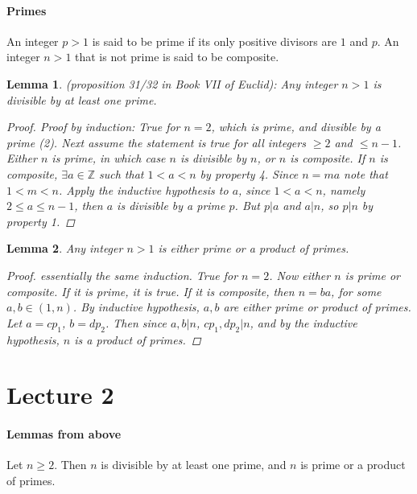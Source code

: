 \documentclass[10pt,letter]{article}
\theoremstyle{plain}
\newtheorem*{lemma*}{Lemma}
\theoremstyle{definition}
\begin{document}
\paragraph{Primes}
An integer $p>1$ is said to be prime if its only positive divisors are $1$ and $p$. An integer $n>1$ that is not prime is said to be composite. \\ 
\begin{lemma*}(proposition 31/32 in Book VII of Euclid): Any integer $n>1$ is divisible by at least one prime. 
\begin{proof}Proof by induction: True for $n=2$, which is prime, and divsible by a prime (2). Next assume the statement is true for all integers $\geq2$ and $\leq n-1$. Either $n$ is prime, in which case $n$ is divisible by $n$, or $n$ is composite. If $n$ is composite, $\exists a\in\mathbb{Z}$ such that $1<a<n$ by property 4. Since $n=ma$ note that $1<m<n$. Apply the inductive hypothesis to $a$, since $1<a<n$, namely $2\leq a\leq n-1$, then $a$ is divisible by a prime $p$. But $p|a$ and $a|n$, so $p|n$ by property 1.
\end{proof}
\end{lemma*}
\begin{lemma*}
Any integer $n>1$ is either prime or a product of primes. 
\begin{proof}
essentially the same induction. True for $n=2$. Now either $n$ is prime or composite. If it is prime, it is true. If it is composite, then $n=ba$, for some $a,b\in (1,n)$. By inductive hypothesis, $a,b$ are either prime or product of primes. Let $a=cp_1$, $b=dp_2$. Then since $a,b|n$, $cp_1,dp_2|n$, and by the inductive hypothesis, $n$ is a product of primes.
\end{proof}
\end{lemma*}

\section*{Lecture 2}
\paragraph{Lemmas from above}
Let $n\geq2$. Then $n$ is divisible by at least one prime, and $n$ is prime or a product of primes.
\end{document}
